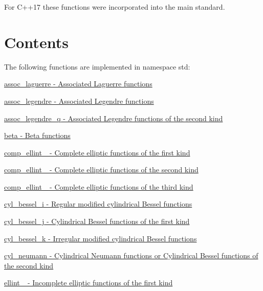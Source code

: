 For C++17 these functions were incorporated into the main standard.\hypertarget{index_contents}{}\section{Contents}\label{index_contents}
The following functions are implemented in namespace {\ttfamily std\+:} 
\begin{DoxyItemize}
\item \hyperlink{group__cxx17__math__spec__func_ga0b33e0ac3066f2353861ce2f34b43f57}{assoc\+\_\+laguerre -\/ Associated Laguerre functions}
\item \hyperlink{group__cxx17__math__spec__func_ga7aa4182446f687094b12688078517d53}{assoc\+\_\+legendre -\/ Associated Legendre functions}
\item \hyperlink{group__gnu__math__spec__func_ga96a1223727fa71ffbf520a98ac3dc885}{assoc\+\_\+legendre\+\_\+q -\/ Associated Legendre functions of the second kind}
\item \hyperlink{group__cxx17__math__spec__func_gacd36403ae64b89840b1504f97024dcee}{beta -\/ Beta functions}
\item \hyperlink{group__cxx17__math__spec__func_gad559217fb01e7a8b7a6e23eeedda64be}{comp\+\_\+ellint\+\_ -\/ Complete elliptic functions of the first kind}
\item \hyperlink{group__cxx17__math__spec__func_gaadf288465eea84ec609d93de96200aaa}{comp\+\_\+ellint\+\_ -\/ Complete elliptic functions of the second kind}
\item \hyperlink{group__cxx17__math__spec__func_ga80419d323d3231870bd588525e818974}{comp\+\_\+ellint\+\_ -\/ Complete elliptic functions of the third kind}
\item \hyperlink{group__cxx17__math__spec__func_ga29504b6008798072b0b8d6ea5a50ec60}{cyl\+\_\+bessel\+\_\+i -\/ Regular modified cylindrical Bessel functions}
\item \hyperlink{group__cxx17__math__spec__func_ga644f7eb975809674db88768f2f115744}{cyl\+\_\+bessel\+\_\+j -\/ Cylindrical Bessel functions of the first kind}
\item \hyperlink{group__cxx17__math__spec__func_gac73d664b8e7ceba7f8e786c93e97a084}{cyl\+\_\+bessel\+\_\+k -\/ Irregular modified cylindrical Bessel functions}
\item \hyperlink{group__cxx17__math__spec__func_ga1e4bef23704469b0704cf15c5f04e29e}{cyl\+\_\+neumann -\/ Cylindrical Neumann functions or Cylindrical Bessel functions of the second kind}
\item \hyperlink{group__cxx17__math__spec__func_ga1550d6947bbbeee9865aabd398102a36}{ellint\+\_ -\/ Incomplete elliptic functions of the first kind}

\end{DoxyItemize}
